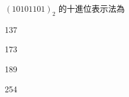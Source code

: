 \ifx {} \undefined
[92年 基北區]
\fi
${(10101101)}_2$ 的十進位表示法為
\begin{optionlist}
\item 137
\item 173\label{ntpc-92-a1}
\item 189
\item 254
\end{optionlist}